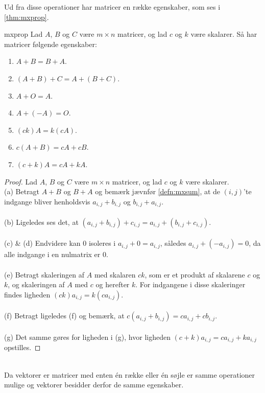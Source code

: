 %
Ud fra disse operationer har matricer en række egenskaber, som ses i \ref{thm:mxprop}.
\begin{thm}{}{mxprop}
Lad $A$, $B$ og $C$ være $m \times n$ matricer, og lad $c$ og $k$ være skalarer.
Så har matricer følgende egenskaber:
\begin{enumerate}[label=(\alph*)]
\item $A + B = B + A$.
\item $(A + B) + C = A + (B + C)$.
\item $A + O = A$.
\item $A + (-A) = O$.
\item $(ck)A = k(cA)$.
\item $c(A + B) = cA + cB$.
\item $(c + k)A = cA + kA$.
\end{enumerate}
\end{thm}
%
\begin{proof} %
Lad $A$, $B$ og $C$ være $m \times n$ matricer, og lad $c$ og $k$ være skalarer.\\
(a) Betragt $A + B$ og $B + A$ og bemærk jævnfør \ref{defn:mxsum}, at de $(i,j)$'te indgange bliver henholdsvis $a_{i,j} + b_{i,j}$ og $b_{i,j} + a_{i,j}$.\\\\
(b)
Ligeledes ses det, at $(a_{i,j} + b_{i,j}) + c_{i,j} = a_{i,j} + (b_{i,j} + c_{i,j})$.\\\\
(c) \& (d)
Endvidere kan $0$ isoleres i $a_{i,j} + 0 = a_{i,j}$, således $a_{i,j} + (-a_{i,j}) = 0$, da alle indgange i en nulmatrix er $0$.
\\\\
%
(e) Betragt skaleringen af $A$ med skalaren $ck$, som er et produkt af skalarene $c$ og $k$, og skaleringen af $A$ med $c$ og herefter $k$.
For indgangene i disse skaleringer findes ligheden $(ck)a_{i,j} = k(ca_{i,j})$.\\\\
(f)
Betragt ligeledes (f) og bemærk, at $c(a_{i,j} + b_{i,j}) = ca_{i,j} + cb_{i,j}$.\\\\
(g)
Det samme gøres for ligheden i (g), hvor ligheden $(c + k)a_{i,j} = ca_{i,j} + ka_{i,j}$ opstilles.
\end{proof}
\noindent
\\
%
Da vektorer er matricer med enten én række eller én søjle er samme operationer mulige og vektorer besidder derfor de samme egenskaber.
%
\\\\
\phantom{Hejmeddig}
\\\\